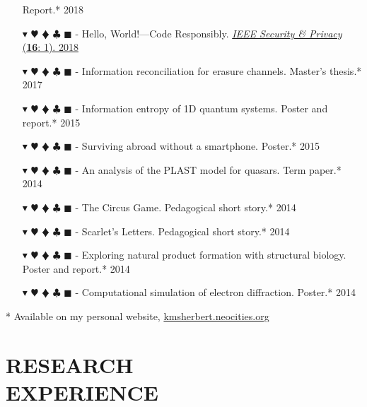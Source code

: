 \documentclass[overlapped, 10pt]{res} %
\newcommand{\physics}{$\blacktriangledown$}
\newcommand{\biochem}{$\varheartsuit$}
\newcommand{\shannon}{$\vardiamondsuit$}
\newcommand{\classic}{$\clubsuit$}
\newcommand{\quantum}{$\blacksquare$}
\newcommand{\physicscolor}{\color{YellowOrange}}
\newcommand{\biochemcolor}{\color{Emerald}}
\newcommand{\shannoncolor}{\color{Goldenrod}}
\newcommand{\classiccolor}{\color{Cyan}}
\newcommand{\quantumcolor}{\color{RedOrange}}
\newcommand{\tag}[1]{
    {\IfSubStr{#1}{\physics}{\physicscolor}{\color{White}}\physics}
    {\IfSubStr{#1}{\biochem}{\biochemcolor}{\color{White}}\biochem}
    {\IfSubStr{#1}{\shannon}{\shannoncolor}{\color{White}}\shannon}
    {\IfSubStr{#1}{\classic}{\classiccolor}{\color{White}}\classic}
    {\IfSubStr{#1}{\quantum}{\quantumcolor}{\color{White}}\quantum}
}
\begin{document}
\begin{resume}
\begin{itemize}
    \hfill Report.* 2018
\item[\tag{\classic}-] Hello, World!—Code Responsibly.
    \hfill \href{https://ieeexplore.ieee.org/document/8283486}{\textit{IEEE Security \& Privacy} (\textbf{16}: 1). 2018}
\item[\tag{\shannon\classic}-] Information reconciliation for erasure channels.
    \hfill Master's thesis.* 2017
\item[\tag{\physics\shannon\classic}-] Information entropy of 1D quantum systems.
    \hfill Poster and report.* 2015
\item[\tag{}-] Surviving abroad without a smartphone.
    \hfill Poster.* 2015
\item[\tag{\physics}-] An analysis of the PLAST model for quasars.
    \hfill Term paper.* 2014
\item[\tag{\shannon}-] The Circus Game.
    \hfill Pedagogical short story.* 2014
\item[\tag{\physics}-] Scarlet's Letters.
    \hfill Pedagogical short story.* 2014
\item[\tag{\biochem}-] Exploring natural product formation with structural biology.
    \hfill Poster and report.* 2014
\item[\tag{\physics\classic}-] Computational simulation of electron diffraction.
    \hfill Poster.* 2014
\end{itemize}

* Available on my personal website, \href{kmsherbert.neocities.org}{kmsherbert.neocities.org}


\section{RESEARCH\\EXPERIENCE}


\end{resume}
\end{document}

